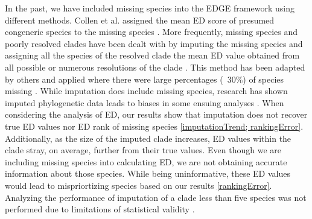 \documentclass[12pt,english]{article}
\begin{document}
In the past, we have included missing species into the EDGE framework using
different methods. Collen et al. assigned the mean ED score of presumed
congeneric species to the missing species \citeyear{Collen2011}. More
frequently, missing species and poorly resolved clades have been dealt with by
imputing the missing species and assigning all the species of the resolved
clade the mean ED value obtained from all possible or numerous resolutions of
the clade \autocite{Isaac2007; Isaac2012}. This method has been adapted by
others and applied where there were large percentages (~30\%) of species
missing \autocite{Jetz2014}.
While imputation does include missing species, research has shown
imputed phylogenetic data leads to biases in some ensuing analyses
\autocite{Rabosky2014}.
When considering the analysis of ED, our results show that imputation
does not recover true ED values nor ED rank of missing species
\ref{imputationTrend; rankingError}. Additionally, as the size of the
imputed clade increases, ED values within the clade stray, on average,
further from their true values.
Even though we are including missing species into calculating ED, we
are not obtaining accurate information about those species. While
being uninformative, these ED values would lead to mispriortizing
species based on our results \ref{rankingError}.
Analyzing the performance of imputation of a clade less than five
species was not performed due to limitations of statistical validity
\autocite{Crawley2012}.
\end{document}
